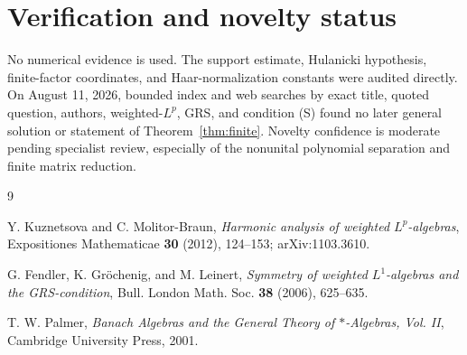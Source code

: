 \documentclass[11pt]{article}
\begin{document}
\section{Verification and novelty status}

No numerical evidence is used.  The support estimate, Hulanicki hypothesis,
finite-factor coordinates, and Haar-normalization constants were audited
directly.  On August 11, 2026, bounded index and web searches by exact title,
quoted question, authors, weighted-$L^p$, GRS, and condition (S) found no
later general solution or statement of Theorem~\ref{thm:finite}.  Novelty
confidence is moderate pending specialist review, especially of the
nonunital polynomial separation and finite matrix reduction.

{\footnotesize
\begin{thebibliography}{9}
\setlength{\itemsep}{1pt}

Y. Kuznetsova and C. Molitor-Braun,
\emph{Harmonic analysis of weighted $L^p$-algebras},
Expositiones Mathematicae \textbf{30} (2012), 124--153;
arXiv:1103.3610.

G. Fendler, K. Gr\"ochenig, and M. Leinert,
\emph{Symmetry of weighted $L^1$-algebras and the GRS-condition},
Bull. London Math. Soc. \textbf{38} (2006), 625--635.

T. W. Palmer,
\emph{Banach Algebras and the General Theory of $*$-Algebras, Vol. II},
Cambridge University Press, 2001.

\end{thebibliography}
}
\end{document}
